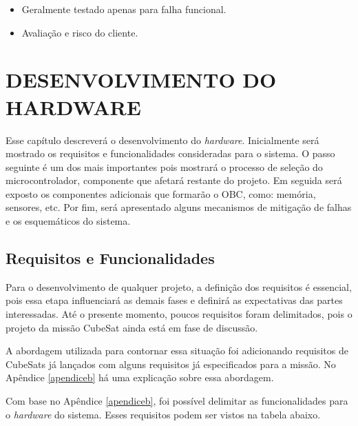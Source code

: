 \begin{itemize}
\begin{itemize}
	\item Geralmente testado apenas para falha funcional.
    \item Avaliação e risco do cliente.

	\end{itemize}
\end{itemize}


\chapter[DESENVOLVIMENTO DO HARDWARE]{DESENVOLVIMENTO DO HARDWARE}
\label{secaoHardware}
Esse capítulo descreverá o desenvolvimento do \textit{hardware}. Inicialmente será mostrado os requisitos e funcionalidades consideradas para o sistema. O passo seguinte é um dos mais importantes pois mostrará o processo de seleção do microcontrolador, componente que afetará restante do projeto. Em seguida será exposto os componentes adicionais que formarão o OBC, como: memória, sensores, etc. Por fim, será apresentado alguns mecanismos de mitigação de falhas e os esquemáticos do sistema.



\section{Requisitos e Funcionalidades}
\label{seção1_1}
Para o desenvolvimento de qualquer projeto, a definição dos requisitos é essencial, pois essa etapa influenciará as demais fases e definirá as expectativas das partes interessadas. Até o presente momento, poucos requisitos foram delimitados, pois o projeto da missão CubeSat ainda está em fase de discussão. 

A abordagem utilizada para contornar essa situação foi adicionando requisitos de CubeSats já lançados com alguns requisitos já especificados para a missão. No Apêndice \ref{apendiceb} há uma explicação sobre essa abordagem. 

Com base no Apêndice \ref{apendiceb}, foi possível delimitar as funcionalidades para o \textit{hardware} do sistema. Esses requisitos podem ser vistos na tabela abaixo.

